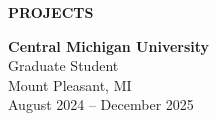 \documentclass[letterpaper,12pt]{article}
\begin{document}




\textbf{PROJECTS}

\vspace{4pt}

\textbf{Central Michigan University} \\
Graduate Student \\
Mount Pleasant, MI \\
August 2024 -- December 2025
\end{document}
